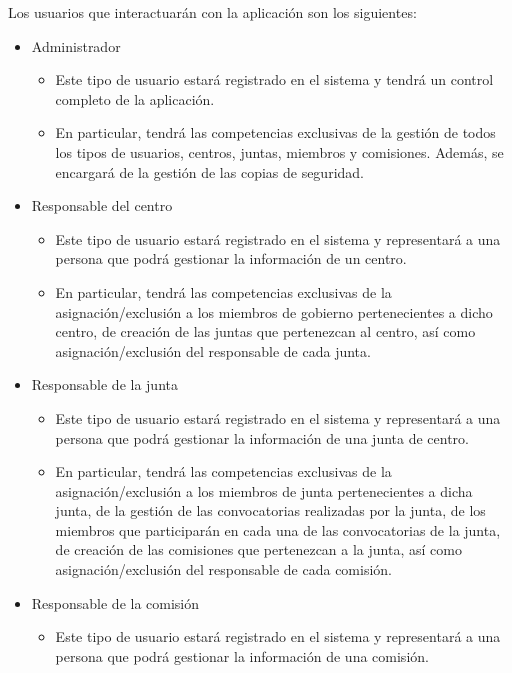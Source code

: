     Los usuarios que interactuarán con la aplicación son los siguientes:
    \begin{itemize}
        \item Administrador
          \begin{itemize}
              \item Este tipo de usuario estará registrado en el sistema y tendrá un control completo de la aplicación. 
              \item En particular, tendrá las competencias exclusivas de la gestión de todos los tipos de usuarios, centros, juntas, miembros y comisiones. Además, se encargará de la gestión de las copias de seguridad.
          \end{itemize}
          \item Responsable del centro
           \begin{itemize}
               \item Este tipo de usuario estará registrado en el sistema y representará a una persona que podrá gestionar la información de un centro.
               \item En particular, tendrá las competencias exclusivas de la asignación/exclusión a los miembros de gobierno pertenecientes a dicho centro, de creación de las juntas que pertenezcan al centro, así como asignación/exclusión del responsable de cada junta.
            \end{itemize}
            \item Responsable de la junta
           \begin{itemize}
               \item Este tipo de usuario estará registrado en el sistema y representará a una persona que podrá gestionar la información de una junta de centro.
               \item En particular, tendrá las competencias exclusivas de la asignación/exclusión a los miembros de junta pertenecientes a dicha junta, de la gestión de las convocatorias realizadas por la junta, de los miembros que participarán en cada una de las convocatorias de la junta, de creación de las comisiones que pertenezcan a la junta, así como asignación/exclusión del responsable de cada comisión.
            \end{itemize}
          \item Responsable de la comisión 
           \begin{itemize}
               \item Este tipo de usuario estará registrado en el sistema y representará a una persona que podrá gestionar la información de una comisión.

\end{itemize}
\end{itemize}
